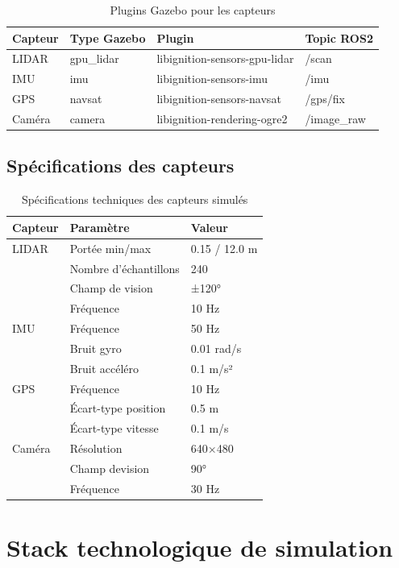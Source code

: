 \documentclass[a4paper,12pt]{report}
\begin{document}
\begin{table}[htbp]
\centering
\caption{Plugins Gazebo pour les capteurs}
\begin{tabular}{@{}lllp{5cm}@{}}
\toprule
\textbf{Capteur} & \textbf{Type Gazebo} & \textbf{Plugin} & \textbf{Topic ROS2} \\
\midrule
LIDAR & gpu\_lidar & libignition-sensors-gpu-lidar & /scan \\
IMU & imu & libignition-sensors-imu & /imu \\
GPS & navsat & libignition-sensors-navsat & /gps/fix \\
Caméra & camera & libignition-rendering-ogre2 & /image\_raw \\
\bottomrule
\end{tabular}
\end{table}

\subsection{Spécifications des capteurs}

\begin{table}[htbp]
\centering
\caption{Spécifications techniques des capteurs simulés}
\begin{tabular}{@{}llp{6cm}@{}}
\toprule
\textbf{Capteur} & \textbf{Paramètre} & \textbf{Valeur} \\
\midrule
LIDAR & Portée min/max & 0.15 / 12.0 m \\
& Nombre d'échantillons & 240 \\
& Champ de vision & ±120° \\
& Fréquence & 10 Hz \\
\midrule
IMU & Fréquence & 50 Hz \\
& Bruit gyro & 0.01 rad/s \\
& Bruit accéléro & 0.1 m/s² \\
\midrule
GPS & Fréquence & 10 Hz \\
& Écart-type position & 0.5 m \\
& Écart-type vitesse & 0.1 m/s \\
\midrule
Caméra & Résolution & 640×480 \\
& Champ devision & 90° \\
& Fréquence & 30 Hz \\
\bottomrule
\end{tabular}
\end{table}

\section{Stack technologique de simulation}
\end{document}
